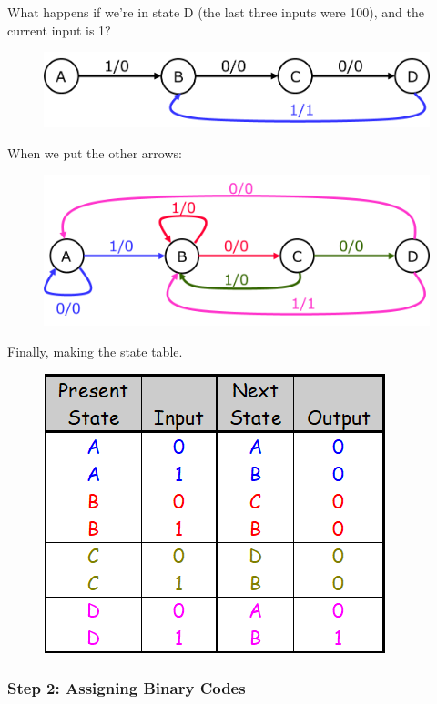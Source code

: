What happens if we're in state D (the last three inputs were 100), and the current input is 1?
\begin{figure}[H]
  \centering
  \includegraphics[width=.85\linewidth]{img/design-example-state-diagram-2.png}
\end{figure}

\noindent When we put the other arrows:
\begin{figure}[H]
  \centering
  \includegraphics[width=\linewidth]{img/design-example-state-diagram-4.png}
\end{figure}
\noindent Finally, making the state table.
\begin{figure}[H]
  \centering
  \includegraphics[width=.8\linewidth]{img/desing-example-state-table.png}
\end{figure}

\vspace*{\fill}
\columnbreak

\subsubsection{Step 2: Assigning Binary Codes}
\label{subsubsec:step2-assign-bin-code}

